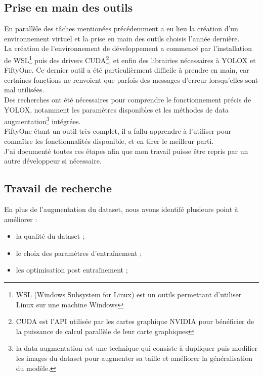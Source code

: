 \subsection{Prise en main des outils}

En parallèle des tâches mentionées précédemment a eu lieu la création d'un environnement
virtuel et la prise en main des outils choisis l'année dernière.\\

La création de l'environnement de développement a commencé par l'installation
de WSL\footnote{WSL (Windows Subsystem for Linux) est un outils permettant d'utiliser
Linux sur une machine Windows} puis des drivers CUDA\footnote{CUDA est l'API utilisée par
les cartes graphique NVIDIA pour bénéficier de la puissance de calcul parallèle
de leur carte graphiques}, et enfin des librairies nécessaires à YOLOX et FiftyOne.
Ce dernier outil a été particulièrment difficile à prendre en main,
car certaines fonctions ne renvoient que parfois des messages d'erreur
lorsqu'elles sont mal utilisées.\\

Des recherches ont été nécessaires pour comprendre le fonctionnement précis de YOLOX,
notamment les paramètres disponibles et les méthodes de data augmentation\footnote{la
data augmentation est une technique qui consiste à dupliquer puis modifier les images
du dataset pour augmenter sa taille et améliorer la généralisation du modèle.} intégrées. \\

FiftyOne étant un outil très complet, il a fallu apprendre à l'utiliser pour connaître
les fonctionnalités disponible, et en tirer le meilleur parti. \\


J'ai documenté toutes ces étapes afin que mon travail puisse être repris par un autre
développeur si nécessaire.\\

\subsection{Travail de recherche}

En plus de l'augmentation du dataset, nous avons identifé plusieurs point à améliorer :

\begin{itemize}
    \item la qualité du dataset ;
    \item le choix des paramètres d'entraînement ;
    \item les optimisation post entraînement ;
\end{itemize}

